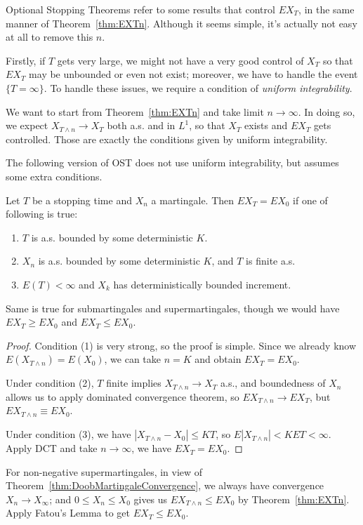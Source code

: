 Optional Stopping Theorems refer to some results that control $E X_T$, in the same manner of Theorem~\ref{thm:EXTn}. Although it seems simple, it's actually not easy at all to remove this $n$.

Firstly, if $T$ gets very large, we might not have a very good control of $X_T$ so that $E X_T$ may be unbounded or even not exist; moreover, we have to handle the event $\{T = \infty \}$. To handle these issues, we require a condition of \textit{uniform integrability}.

We want to start from Theorem~\ref{thm:EXTn} and take limit $n \to \infty $. In doing so, we expect $X_{T \wedge n} \to  X_T$ both a.s. and in $L^1$, so that $X_T$ exists and $E X_T$ gets controlled. Those are exactly the conditions given by uniform integrability.

The following version of OST does not use uniform integrability, but assumes some extra conditions.
\begin{theorem}
	Let $T$ be a stopping time and $X_n$ a martingale. Then $E X_T = E X_0$ if one of following is true:
	\begin{enumerate}
		\item $T$ is a.s. bounded by some deterministic $K$.
		\item $X_n$ is a.s. bounded by some deterministic $K$, and $T$ is finite a.s.
		\item $E(T) < \infty $ and $X_k$ has deterministically bounded increment.
	\end{enumerate}

	Same is true for submartingales and supermartingales, though we would have $E X_T \ge E X_0$ and $E X_T \le E X_0$.
\end{theorem}
\begin{proof}
	Condition (1) is very strong, so the proof is simple. Since we already know $E(X_{T \wedge n}) = E(X_0)$, we can take $n = K$ and obtain $EX_T = EX_0$.

	Under condition (2), $T$ finite implies $X_{T \wedge n} \to  X_T$ a.s., and boundedness of $X_n$ allows us to apply dominated convergence theorem, so $E X_{T \wedge n} \to  E X_T$, but $E X_{T \wedge n} \equiv E X_0$.

	Under condition (3), we have $|X_{T \wedge n} - X_0| \le  K T$, so $E|X_{T \wedge n}| < K ET < \infty $. Apply DCT and take $n \to \infty $, we have $E X_T = E X_0$.
\end{proof}

\begin{remark}
	For non-negative supermartingales, in view of Theorem~\ref{thm:DoobMartingaleConvergence}, we always have convergence  $X_n \to X_\infty $; and $0 \le X_n \le X_0$ gives us $E X_{T \wedge n} \le  E X_0$ by Theorem~\ref{thm:EXTn}. Apply Fatou's Lemma to get $E X_T \le  E X_0$.
\end{remark}

